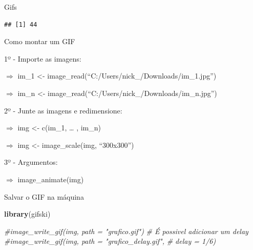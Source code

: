 \documentclass[
  ignorenonframetext,
]{beamer}
\newenvironment{Shaded}{\begin{snugshade}}{\end{snugshade}}
\newcommand{\CommentTok}[1]{\textcolor[rgb]{0.56,0.35,0.01}{\textit{#1}}}
\newcommand{\KeywordTok}[1]{\textcolor[rgb]{0.13,0.29,0.53}{\textbf{#1}}}
\newcommand{\NormalTok}[1]{#1}
\newcommand{\OperatorTok}[1]{\textcolor[rgb]{0.81,0.36,0.00}{\textbf{#1}}}
\newcommand{\StringTok}[1]{\textcolor[rgb]{0.31,0.60,0.02}{#1}}
\begin{document}
\begin{frame}[fragile]{Gifs}
\protect\hypertarget{gifs}{}

\begin{Shaded}
\end{Shaded}

\begin{verbatim}
## [1] 44
\end{verbatim}

\end{frame}

\begin{frame}{Como montar um GIF}
\protect\hypertarget{como-montar-um-gif}{}

1º - Importe as imagens:

\(\Rightarrow\) im\_1 \textless-
image\_read(``C:/Users/nick\_/Downloads/im\_1.jpg'')

\(\Rightarrow\) im\_n \textless-
image\_read(``C:/Users/nick\_/Downloads/im\_n.jpg'')

2º - Junte as imagens e redimensione:

\(\Rightarrow\) img \textless- c(im\_1, \ldots{} , im\_n)

\(\Rightarrow\) img \textless- image\_scale(img, ``300x300'')

3º - Argumentos:

\(\Rightarrow\) image\_animate(img)

\end{frame}

\begin{frame}[fragile]{Salvar o GIF na máquina}
\protect\hypertarget{salvar-o-gif-na-muxe1quina}{}

\begin{Shaded}
\begin{Highlighting}[]
\KeywordTok{library}\NormalTok{(gifski)}

\CommentTok{#image_write_gif(img, path = "grafico.gif")}
\CommentTok{# É possivel adicionar um delay}
\CommentTok{#image_write_gif(img, path = "grafico_delay.gif",}
\CommentTok{#                delay = 1/6)}
\end{Highlighting}
\end{Shaded}

\end{frame}
\end{document}
